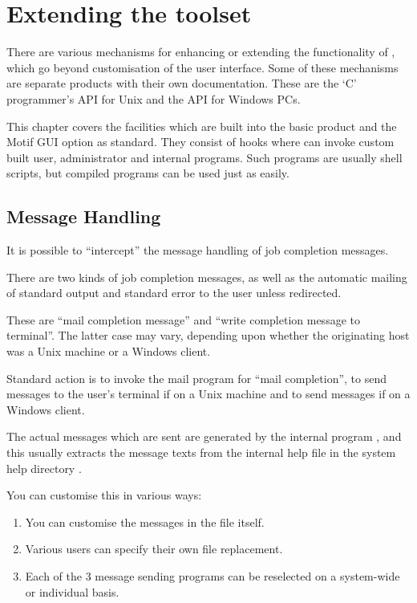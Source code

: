 \chapter{Extending the toolset}
\label{chp:extensibility}
\label{bkm:Extensibility}There are various mechanisms for enhancing or extending the functionality of \ProductName{}, which go beyond customisation
of the user interface. Some of these mechanisms are separate products with their own documentation. These are the `C' programmer's API
for Unix and the API for Windows PCs.

This chapter covers the facilities which are built into the basic product and the Motif GUI option as standard. They consist of hooks
where \ProductName{} can invoke custom built user, administrator and internal programs. Such programs are usually shell scripts, but compiled
programs can be used just as easily.

\section{Message Handling}
It is possible to ``intercept'' the message handling of job completion messages.

There are two kinds of job completion messages, as well as the automatic mailing of standard output and standard error to the user unless
redirected.

These are ``mail completion message'' and ``write completion message to terminal''.
The latter case may vary, depending upon whether the originating host was a Unix machine or a Windows client.

Standard action is to invoke the mail program for ``mail completion'',  to send
messages to the user's terminal if on a Unix machine and  to send messages if on a Windows
client.

The actual messages which are sent are generated by the internal program , and this usually extracts the message
texts from the internal help file  in the system help directory \helpdir.

You can customise this in various ways:

\begin{enumerate}
\item You can customise the messages in the  file itself.
\item Various users can specify their own  file replacement.
\item Each of the 3 message sending programs can be reselected on a system-wide or individual basis.
\end{enumerate}

